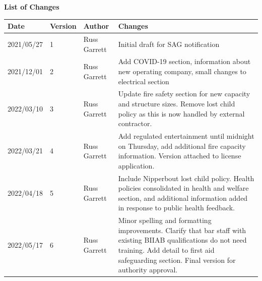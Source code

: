 \begin{titlepage}
\begin{center}
    \textbf{List of Changes}
    \begin{tabular}{l | l | l | p{9cm}}
      Date & Version & Author & Changes \\
      \hline
      2021/05/27 & 1 & Russ Garrett & Initial draft for SAG notification \\
      2021/12/01 & 2 & Russ Garrett & Add COVID-19 section, information about new operating company, small changes to electrical section \\
      2022/03/10 & 3 & Russ Garrett & Update fire safety section for new capacity and structure sizes. Remove lost child policy as this
                                      is now handled by external contractor. \\
      2022/03/21 & 4 & Russ Garrett & Add regulated entertainment until midnight on Thursday, add additional fire capacity information.
                                      Version attached to license application. \\
      2022/04/18 & 5 & Russ Garrett & Include Nipperbout lost child policy. Health policies consolidated in health and welfare section,
                                        and additional information added in response to public health feedback. \\
      2022/05/17 & 6 & Russ Garrett & Minor spelling and formatting improvements. Clarify that bar staff with existing BIIAB qualifications
                                        do not need training. Add detail to first aid safeguarding section.
                                        Final version for authority approval. \\
    \end{tabular}
\end{center}
\end{titlepage}
\setcounter{page}{2}

\tableofcontents

\newpage




